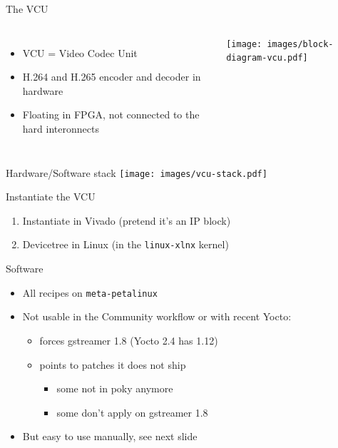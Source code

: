 \documentclass[xetex,table]{beamer}
\begin{document}
\begin{frame}{The VCU}
  \begin{columns}
    \begin{itemize}
    \item VCU = Video Codec Unit
    \item H.264 and H.265 encoder and decoder in hardware
    \item Floating in FPGA, not connected to the hard interonnects
    \end{itemize}
    \texttt{[image: images/block-diagram-vcu.pdf]}
  \end{columns}
\end{frame}

\begin{frame}{Hardware/Software stack}
  \center\texttt{[image: images/vcu-stack.pdf]}
\end{frame}

\begin{frame}{Instantiate the VCU}
  \begin{enumerate}
  \item Instantiate in Vivado (pretend it's an IP block)
  \item Devicetree in Linux (in the {\tt linux-xlnx} kernel)
  \end{enumerate}
\end{frame}

\begin{frame}{Software}
  \begin{itemize}
  \item All recipes on {\tt meta-petalinux}
  \item Not usable in the Community workflow or with recent Yocto:
    \begin{itemize}
    \item forces gstreamer 1.8 (Yocto 2.4 has 1.12)
    \item points to patches it does not ship
      \begin{itemize}
      \item some not in poky anymore
      \item some don't apply on gstreamer 1.8
      \end{itemize}
    \end{itemize}
  \item But easy to use manually, see next slide
  \end{itemize}
\end{frame}
\end{document}
